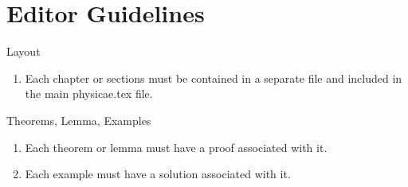 \chapter{Editor Guidelines}
\begin{description}
    \item{Layout} \hfill \\
    \begin{enumerate}
        \item Each chapter or sections must be contained in a separate file and included in the main physicae.tex file.
    \end{enumerate}
    \item{Theorems, Lemma, Examples} \hfill \\
    \begin{enumerate}
        \item Each theorem or lemma must have a proof associated with it.
        \item Each example must have a solution associated with it.
    \end{enumerate}
\end{description}

